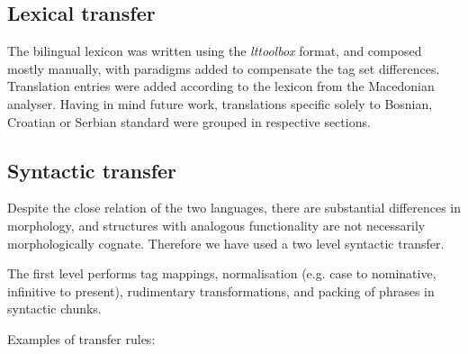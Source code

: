 \documentclass{book}
\begin{document}
\subsection*{Lexical transfer}
The bilingual lexicon was written using the \emph{lttoolbox} format, and composed mostly 
manually, with paradigms added to compensate the tag set differences.
Translation entries were added according to the lexicon from 
the Macedonian analyser. Having in mind future work, translations specific solely 
to Bosnian, Croatian or Serbian standard were grouped in respective sections.

\subsection*{Syntactic transfer}
Despite the close relation of the two languages, there are substantial 
differences in morphology, and structures with analogous functionality 
are not necessarily morphologically cognate. Therefore we have used 
a two level syntactic transfer. 

The first level performs tag mappings, normalisation (e.g. 
case to nominative, infinitive to present), 
rudimentary transformations, and packing of phrases in syntactic chunks. 

Examples of transfer rules:
\end{document}
